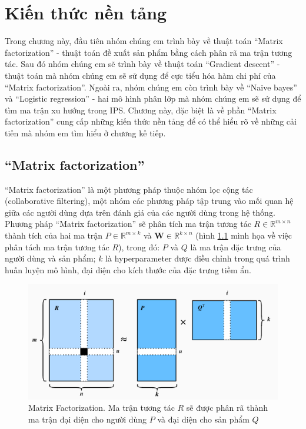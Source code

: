 \chapter{Kiến thức nền tảng}
\label{Chapter2}

Trong chương này, đầu tiên nhóm chúng em trình bày về thuật toán ``Matrix factorization'' - thuật toán đề xuất sản phẩm bằng cách phân rã ma trận tương tác. Sau đó nhóm chúng em sẽ trình bày về thuật toán ``Gradient descent'' - thuật toán mà nhóm chúng em sẽ sử dụng để cực tiểu hóa hàm chi phí của  ``Matrix factorization''. Ngoài ra, nhóm chúng em còn trình bày về ``Naive bayes'' và ``Logistic regression'' - hai mô hình phân lớp mà nhóm chúng em sẽ sử dụng để tìm ma trận xu hướng trong IPS. Chương này, đặc biệt là về phần ``Matrix factorization'' cung cấp những kiến thức nền tảng để có thể hiểu rõ về những cải tiến mà nhóm em tìm hiểu ở chương kế tiếp.

\section{``Matrix factorization''}
``Matrix factorization'' là một phương pháp thuộc nhóm lọc cộng tác (collaborative filtering), một nhóm các phương pháp tập trung vào mối quan hệ giữa các người dùng dựa trên đánh giá của các người dùng trong hệ thống. 
Phương pháp ``Matrix factorization'' sẽ phân tích ma trận tương tác $R \in \mathbb{R}^{m \times n}$ thành tích của hai ma trận $P \in \mathbb{R}^{m \times k}$ và $\mathbf{W} \in \mathbb{R}^{k \times n}$ (hình \ref{fig:chap2_MF1} mình họa về việc phân tách ma trận tương tác $R$), trong đó: $P$ và  $Q$ là ma trận đặc trưng của người dùng và sản phẩm; $k$ là hyperparameter được điều chỉnh trong quá trình huấn luyện mô hình, đại diện cho kích thước của đặc trưng tiềm ẩn.

\begin{figure}[h]
    \centering
    \includegraphics[width = \textwidth]{Chapter2/MF1.png}
    \caption{Matrix Factorization. Ma trận tương tác $R$ sẽ được phân rã thành ma trận đại diện cho người dùng $P$ và đại diện cho sản phẩm $Q$}
    \label{fig:chap2_MF1}
\end{figure}

